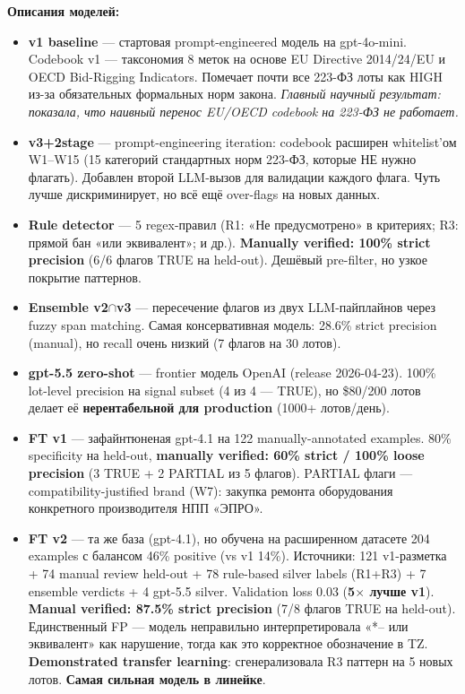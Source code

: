 \documentclass[a4paper,10pt]{article}
\begin{document}
\vspace{6pt}
\noindent\textbf{Описания моделей:}

\begin{itemize}\setlength{\itemsep}{1pt}
\item \textbf{v1 baseline} --- стартовая prompt-engineered модель на gpt-4o-mini. Codebook v1 — таксономия 8 меток на основе EU Directive 2014/24/EU и OECD Bid-Rigging Indicators. Помечает почти все 223-ФЗ лоты как HIGH из-за обязательных формальных норм закона. \textit{Главный научный результат: показала, что наивный перенос EU/OECD codebook на 223-ФЗ не работает.}

\item \textbf{v3+2stage} --- prompt-engineering iteration: codebook расширен whitelist'ом W1--W15 (15 категорий стандартных норм 223-ФЗ, которые НЕ нужно флагать). Добавлен второй LLM-вызов для валидации каждого флага. Чуть лучше дискриминирует, но всё ещё over-flags на новых данных.

\item \textbf{Rule detector} --- 5 regex-правил (R1: «Не предусмотрено» в критериях; R3: прямой бан «или эквивалент»; и др.). \textbf{Manually verified: 100\% strict precision} (6/6 флагов TRUE на held-out). Дешёвый pre-filter, но узкое покрытие паттернов.

\item \textbf{Ensemble v2$\cap$v3} --- пересечение флагов из двух LLM-пайплайнов через fuzzy span matching. Самая консервативная модель: 28.6\% strict precision (manual), но recall очень низкий (7 флагов на 30 лотов).

\item \textbf{gpt-5.5 zero-shot} --- frontier модель OpenAI (release 2026-04-23). 100\% lot-level precision на signal subset (4 из 4 — TRUE), но \$80/200 лотов делает её \textbf{нерентабельной для production} (1000+ лотов/день).

\item \textbf{FT v1} --- зафайнтюненая gpt-4.1 на 122 manually-annotated examples. 80\% specificity на held-out, \textbf{manually verified: 60\% strict / 100\% loose precision} (3 TRUE + 2 PARTIAL из 5 флагов). PARTIAL флаги --- compatibility-justified brand (W7): закупка ремонта оборудования конкретного производителя НПП «ЭПРО».

\item \textbf{FT v2} --- та же база (gpt-4.1), но обучена на расширенном датасете 204 examples с балансом 46\% positive (vs v1 14\%). Источники: 121 v1-разметка + 74 manual review held-out + 78 rule-based silver labels (R1+R3) + 7 ensemble verdicts + 4 gpt-5.5 silver. Validation loss 0.03 (\textbf{5$\times$ лучше v1}). \textbf{Manual verified: 87.5\% strict precision} (7/8 флагов TRUE на held-out). Единственный FP — модель неправильно интерпретировала «*-- или эквивалент» как нарушение, тогда как это корректное обозначение в TZ. \textbf{Demonstrated transfer learning}: сгенерализовала R3 паттерн на 5 новых лотов. \textbf{Самая сильная модель в линейке}.
\end{itemize}
\end{document}
